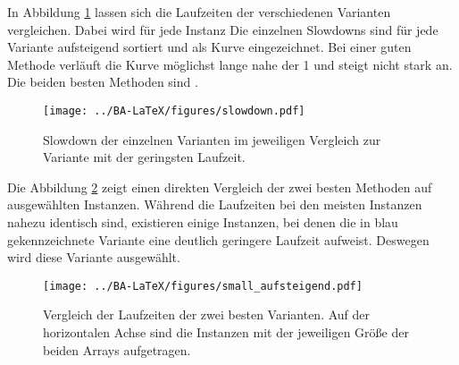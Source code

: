 In Abbildung \ref{fig:messung_slowdown} lassen sich die Laufzeiten der verschiedenen Varianten vergleichen.
Dabei wird für jede Instanz 
Die einzelnen Slowdowns sind für jede Variante aufsteigend sortiert und als Kurve eingezeichnet.
Bei einer guten Methode verläuft die Kurve möglichst lange nahe der 1 und steigt nicht stark an.
Die beiden besten Methoden sind .


\begin{figure}[H]
\centering
	\texttt{[image: ../BA-LaTeX/figures/slowdown.pdf]}
	\caption[Slowdown der einzelnen Varianten im jeweiligen Vergleich zur Variante mit der geringsten Laufzeit.]
	{Slowdown der einzelnen Varianten im jeweiligen Vergleich zur Variante mit der geringsten Laufzeit.}
	\label{fig:messung_slowdown}
\end{figure}

Die Abbildung \ref{fig:messung_small} zeigt einen direkten Vergleich der zwei besten Methoden auf ausgewählten Instanzen.
Während die Laufzeiten bei den meisten Instanzen nahezu identisch sind, existieren einige Instanzen, bei denen die
in blau gekennzeichnete Variante eine deutlich geringere Laufzeit aufweist. Deswegen wird diese Variante %
ausgewählt.

\begin{figure}[H]
\centering
	\texttt{[image: ../BA-LaTeX/figures/small\_aufsteigend.pdf]}
	\caption[Laufzeitvergleich der zwei besten Varianten auf ausgewählten Instanzen] 
	{Vergleich der Laufzeiten der zwei besten Varianten. Auf der horizontalen Achse sind die Instanzen mit der jeweiligen Größe der beiden Arrays aufgetragen.}
	\label{fig:messung_small}
\end{figure}
